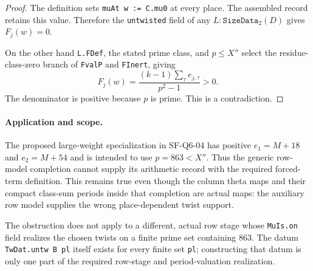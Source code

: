 \documentclass[11pt,a4paper]{article}
\theoremstyle{definition}
\theoremstyle{remark}
\begin{document}
\begin{proof}
The definition  sets
\texttt{muAt w := C.mu0} at every place.  The assembled record
retains this value.  Therefore the \texttt{untwisted} field of
any $L:\texttt{SizeData}_2(D)$ gives $F_j(w)=0$.

On the other hand \texttt{L.FDef}, the stated prime class, and
$p\le X''$ select the residue-class-zero branch of
\texttt{FvalP} and \texttt{FInert}, giving
\[
 F_j(w)=\frac{(k-1)\sum_\tau e_{j,\tau}}{p^2-1}>0.
\]
The denominator is positive because $p$ is prime.  This is a
contradiction.
\end{proof}

\paragraph{Application and scope.}
The proposed large-weight specialization in SF-Q6-04 has positive
$e_1=M+18$ and $e_2=M+54$ and is intended to use $p=863<X''$.
Thus the generic row-model completion cannot supply its arithmetic
record with the required forced-term definition.  This remains true
even though the column theta maps and their compact class-sum
periods inside that completion are actual maps: the auxiliary
row model supplies the wrong place-dependent twist support.

The obstruction does not apply to a different, actual row stage
whose \texttt{MuIs.on} field realizes the chosen twists on a finite
prime set containing $863$.  The datum
\texttt{TwDat.untw B pl} itself exists for every finite set
\texttt{pl}; constructing that datum is only one part of the
required row-stage and period-valuation realization.
\end{document}
